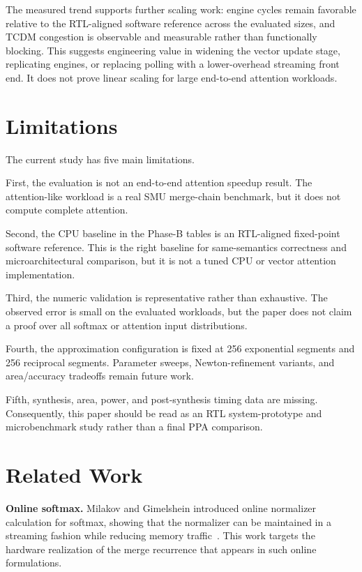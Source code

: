 \documentclass[conference]{IEEEtran}
\begin{document}
The measured trend supports further scaling work: engine cycles remain
favorable relative to the RTL-aligned software reference across the evaluated
sizes, and TCDM congestion is observable and measurable rather than
functionally blocking. This suggests engineering value in widening the vector
update stage, replicating engines, or replacing polling with a lower-overhead
streaming front end. It does not prove linear scaling for large end-to-end
attention workloads.

\section{Limitations}

The current study has five main limitations.

First, the evaluation is not an end-to-end attention speedup result. The
attention-like workload is a real SMU merge-chain benchmark, but it does not
compute complete attention.

Second, the CPU baseline in the Phase-B tables is an RTL-aligned fixed-point
software reference. This is the right baseline for same-semantics correctness
and microarchitectural comparison, but it is not a tuned CPU or vector
attention implementation.

Third, the numeric validation is representative rather than exhaustive. The
observed error is small on the evaluated workloads, but the paper does not
claim a proof over all softmax or attention input distributions.

Fourth, the approximation configuration is fixed at 256 exponential segments
and 256 reciprocal segments. Parameter sweeps, Newton-refinement variants, and
area/accuracy tradeoffs remain future work.

Fifth, synthesis, area, power, and post-synthesis timing data are missing.
Consequently, this paper should be read as an RTL system-prototype and
microbenchmark study rather than a final PPA comparison.

\section{Related Work}

\textbf{Online softmax.}
Milakov and Gimelshein introduced online normalizer calculation for softmax,
showing that the normalizer can be maintained in a streaming fashion while
reducing memory traffic~\cite{online-softmax2018}. This work targets the
hardware realization of the merge recurrence that appears in such online
formulations.
\end{document}
